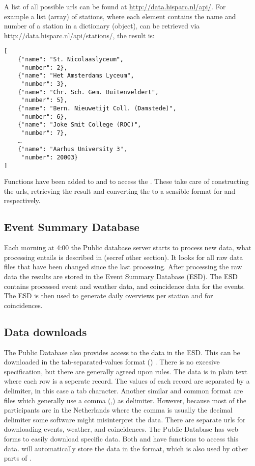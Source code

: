 A list of all possible urls can be found at \url{http://data.hisparc.nl/api/}. For example a list (array) of \hisparc stations, where each element contains the name and number of a station in a dictionary (object), can be retrieved via \url{http://data.hisparc.nl/api/stations/}, the result is:

\begin{verbatim}
[
    {"name": "St. Nicolaaslyceum",
     "number": 2},
    {"name": "Het Amsterdams Lyceum",
     "number": 3},
    {"name": "Chr. Sch. Gem. Buitenveldert",
     "number": 5},
    {"name": "Bern. Nieuwetijt Coll. (Damstede)",
     "number": 6},
    {"name": "Joke Smit College (ROC)",
     "number": 7},
    …
    {"name": "Aarhus University 3",
     "number": 20003}
]
\end{verbatim}

Functions have been added to \sapphire and \jsparc to access the \api. These take care of constructing the urls, retrieving the result and converting the \json to a sensible format for \python and \javascript respectively.


\subsection{Event Summary Database}

Each morning at 4:00 \utc the Public database server starts to process new data, what processing entails is described in (secref other section). It looks for all raw data files that have been changed since the last processing. After processing the raw data the results are stored in the Event Summary Database (ESD). The ESD contains processed event and weather data, and coincidence data for the events. The ESD is then used to generate daily overviews per station and for coincidences.


\subsection{Data downloads}

The Public Database also provides access to the data in the ESD. This can be downloaded in the tab-separated-values format (\tsv) \cite{ianatexttsv}. There is no excesive \tsv specification, but there are generally agreed upon rules. The data is in plain text where each row is a seperate record. The values of each record are separated by a delimiter, in this case a tab character. Another similar and common format are \csv files which generally use a comma (,) as delimiter. However, because most of the \hisparc participants are in the Netherlands where the comma is usually the decimal delimiter some software might misinterpret the data. There are separate urls for downloading events, weather, and coincidences. The Public Database has web forms to easily download specific data. Both \sapphire and \jsparc have functions to access this data. \sapphire will automatically store the data in the \hdf format, which is also used by other parts of \sapphire.


